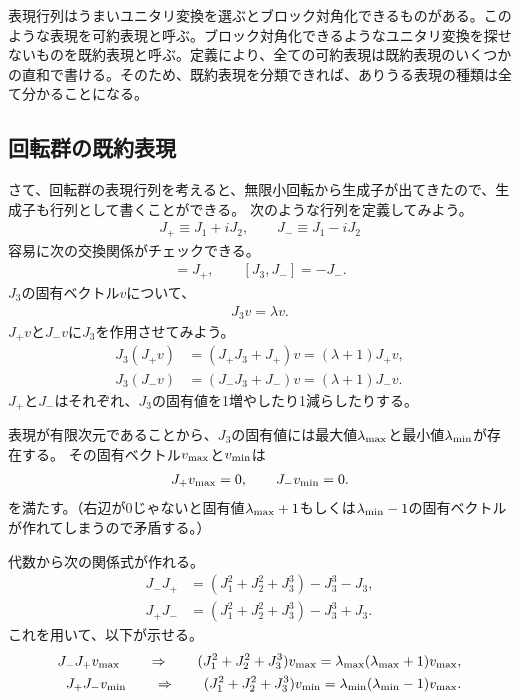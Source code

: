\documentclass[10pt,a4paper]{jarticle}
\begin{document}
表現行列はうまいユニタリ変換を選ぶとブロック対角化できるものがある。このような表現を可約表現と呼ぶ。ブロック対角化できるようなユニタリ変換を探せないものを既約表現と呼ぶ。定義により、全ての可約表現は既約表現のいくつかの直和で書ける。そのため、既約表現を分類できれば、ありうる表現の種類は全て分かることになる。

\subsection{回転群の既約表現}
さて、回転群の表現行列を考えると、無限小回転から生成子が出てきたので、生成子も行列として書くことができる。
次のような行列を定義してみよう。
\begin{align}
J_+ \equiv J_1 + i J_2, \qquad
J_- \equiv J_1 - i J_2
\end{align}
容易に次の交換関係がチェックできる。
\begin{align}
[J_3, J_+] = J_+, \qquad
[J_3, J_-] = -J_-.
\end{align}
$J_3$の固有ベクトル$v$について、
\begin{align}
J_3 v = \lambda v.
\end{align}
%
$J_+ v$と$J_- v$に$J_3$を作用させてみよう。
\begin{align}
J_3 (J_+ v) &= ( J_+ J_3 + J_+ )v = (\lambda + 1) J_+ v, \\
J_3 (J_- v) &= ( J_- J_3 + J_- )v = (\lambda + 1) J_- v.
\end{align}
$J_+$と$J_-$はそれぞれ、$J_3$の固有値を1増やしたり1減らしたりする。

表現が有限次元であることから、$J_3$の固有値には最大値$\lambda_{\rm max}$と最小値$\lambda_{\rm min}$が存在する。
その固有ベクトル$v_{\rm max}$と$v_{\rm min}$は
\begin{align}
J_+ v_{\rm max} = 0, \qquad
J_- v_{\rm min} = 0.
\end{align}
を満たす。（右辺が0じゃないと固有値$\lambda_{\rm max}+1$もしくは$\lambda_{\rm min}-1$の固有ベクトルが作れてしまうので矛盾する。）

代数から次の関係式が作れる。
\begin{align}
J_- J_+ &= (J_1^2 + J_2^2 + J_3^3) - J_3^3 - J_3, \\
J_+ J_- &= (J_1^2 + J_2^2 + J_3^3) - J_3^3 + J_3.
\end{align}
これを用いて、以下が示せる。
\begin{align}
J_- J_+ v_{\rm max} \qquad \Rightarrow \qquad (J_1^2 + J_2^2 + J_3^3) v_{\rm max} = \lambda_{\rm max} (\lambda_{\rm max}+1) v_{\rm max}, \\
J_+ J_- v_{\rm min} \qquad \Rightarrow \qquad (J_1^2 + J_2^2 + J_3^3) v_{\rm min} = \lambda_{\rm min} (\lambda_{\rm min}-1) v_{\rm max}.
\end{align}
\end{document}

